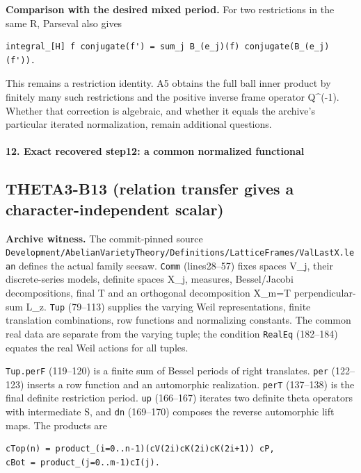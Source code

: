 \textbf{Comparison with the desired mixed period.} For two restrictions in the same R, Parseval also gives

\begin{verbatim}
integral_[H] f conjugate(f') = sum_j B_(e_j)(f) conjugate(B_(e_j)(f')).
\end{verbatim}

This remains a restriction identity. A5 obtains the full ball inner product by finitely many such restrictions and the positive inverse frame operator Q\^{}(-1). Whether that correction is algebraic, and whether it equals the archive's particular iterated normalization, remain additional questions.

\paragraph{12. Exact recovered step12: a common normalized functional}\label{exact-recovered-step12-a-common-normalized-functional}

\subsection{THETA3-B13 (relation transfer gives a character-independent scalar)}\label{theta3-b13-relation-transfer-gives-a-character-independent-scalar}\label{B13}

\textbf{Archive witness.} The commit-pinned source \texttt{Development/AbelianVarietyTheory/Definitions/LatticeFrames/ValLastX.lean} defines the actual family seesaw. \texttt{Comm} (lines28--57) fixes spaces V\_j, their discrete-series models, definite spaces X\_j, measures, Bessel/Jacobi decompositions, final T and an orthogonal decomposition X\_m=T perpendicular-sum L\_z. \texttt{Tup} (79--113) supplies the varying Weil representations, finite translation combinations, row functions and normalizing constants. The common real data are separate from the varying tuple; the condition \texttt{RealEq} (182--184) equates the real Weil actions for all tuples.

\texttt{Tup.perF} (119--120) is a finite sum of Bessel periods of right translates. \texttt{per} (122--123) inserts a row function and an automorphic realization. \texttt{perT} (137--138) is the final definite restriction period. \texttt{up} (166--167) iterates two definite theta operators with intermediate S, and \texttt{dn} (169--170) composes the reverse automorphic lift maps. The products are

\begin{verbatim}
cTop(n) = product_(i=0..n-1)(cV(2i)cK(2i)cK(2i+1)) cP,
cBot = product_(j=0..m-1)cI(j).
\end{verbatim}

